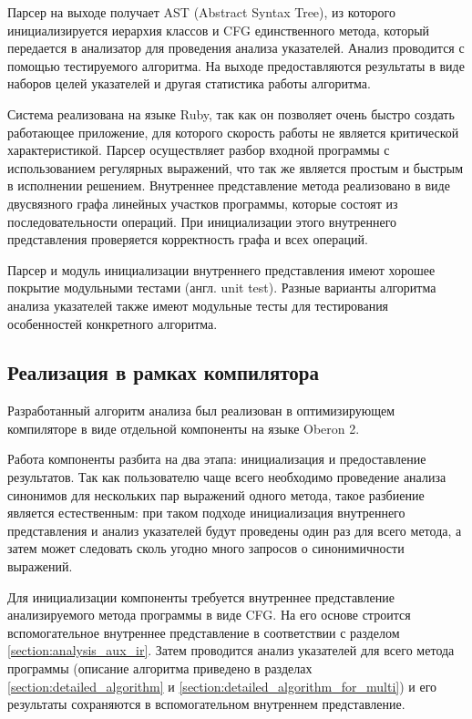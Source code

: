 \documentclass[14pt,titlepage]{extarticle}
\newcommand{\eng}[1]{{\English#1}}
\begin{document}
      Парсер на выходе получает AST (\eng{Abstract Syntax Tree}), из которого
      инициализируется иерархия классов и CFG единственного метода, который
      передается в анализатор для проведения анализа указателей. Анализ
      проводится с помощью тестируемого алгоритма. На выходе предоставляются
      результаты в виде наборов целей указателей и
      другая статистика работы алгоритма.

      Система реализована на языке Ruby, так как он позволяет очень быстро
      создать работающее приложение, для которого скорость работы не является
      критической характеристикой. Парсер осуществляет разбор входной
      программы с использованием регулярных выражений, что так же является
      простым и быстрым в исполнении решением. Внутреннее представление метода
      реализовано в виде двусвязного графа линейных участков программы,
      которые состоят из последовательности операций. При инициализации этого
      внутреннего представления проверяется корректность графа и всех операций.

      Парсер и модуль инициализации внутреннего представления имеют хорошее
      покрытие модульными тестами (англ. \eng{unit test}). Разные варианты
      алгоритма анализа указателей также имеют модульные тесты для тестирования
      особенностей конкретного алгоритма.

    \subsection{Реализация в рамках компилятора}

      Разработанный алгоритм анализа был реализован в оптимизирующем
      компиляторе в виде отдельной компоненты на языке \eng{Oberon} 2.

      Работа компоненты разбита на два этапа: инициализация и предоставление
      результатов. Так как пользователю чаще всего необходимо проведение
      анализа синонимов для нескольких пар выражений одного метода, такое
      разбиение является естественным: при таком подходе инициализация
      внутреннего представления и анализ указателей будут проведены один раз
      для всего метода, а затем может следовать сколь угодно много запросов о
      синонимичности выражений.

      Для инициализации компоненты требуется внутреннее представление
      анализируемого метода программы в виде CFG. На его основе строится
      вспомогательное внутреннее представление в соответствии с разделом
      \ref{section:analysis_aux_ir}. Затем проводится анализ указателей для
      всего метода программы (описание алгоритма приведено в разделах
      \ref{section:detailed_algorithm} и
      \ref{section:detailed_algorithm_for_multi}) и его результаты сохраняются
      в вспомогательном внутреннем представление.
\end{document}

